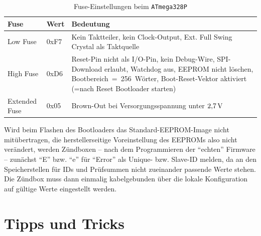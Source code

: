 \documentclass[pdftex, parskip, numbers=noenddot, toc=listof]{scrbook}
\begin{document}
			\begin{table}[h]
				\centering
				\begin{tabularx}{.9\textwidth}{llX}
					\hline\hline
					\textbf{Fuse} & \textbf{Wert}     & \textbf{Bedeutung}                                                                                                                                                                               \\ \hline
					Low Fuse      & 0xF7              & Kein Taktteiler, kein Clock-Output, Ext. Full Swing Crystal als Taktquelle                                                                                                                       \\
					High Fuse     & 0xD6              & Reset-Pin nicht als I/O-Pin, kein Debug-Wire, SPI-Download erlaubt, Watchdog aus, EEPROM nicht löschen, Bootbereich~=~256~Wörter, Boot-Reset-Vektor aktiviert (=nach Reset Bootloader starten) \\
					Extended Fuse & 0x05\footnotemark & Brown-Out bei Versorgungsspannung unter $\unit[2{,}7]{V}$                                                                                                                                        \\ \hline\hline
				\end{tabularx}
				\caption{Fuse-Einstellungen beim \texttt{ATmega328P}}
				\label{tab:fuses}
			\end{table}

			Wird beim Flashen des Bootloaders das Standard-EEPROM-Image nicht mitübertragen, die herstellerseitige Voreinstellung des EEPROMs also nicht verändert, werden Zündboxen -- nach dem Programmieren der \enquote{echten} Firmware -- zunächst \enquote{E} bzw. \enquote{e} für \enquote{Error} als Unique- bzw. Slave-ID melden, da an den Speicherstellen für IDs und Prüfsummen nicht zueinander passende Werte stehen. Die Zündbox muss dann einmalig kabelgebunden über die lokale Konfiguration auf gültige Werte eingestellt werden.


	\chapter{Tipps und Tricks}
\end{document}
